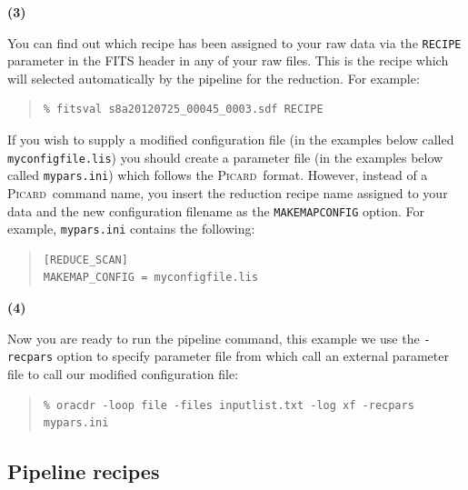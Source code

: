 \documentclass[twoside,11pt]{article}
\newcommand{\xref}[3]{#1}
\newcommand{\xlabel}[1]{}
\renewcommand{\_}{\texttt{\symbol{95}}}
\newenvironment{myquote}{\begin{quote}\begin{small}}{\end{small}\end{quote}}
\newcommand{\picard}{\xref{\textsc{Picard}}{sun265}{}}
\begin{document}
\begin{minipage}[t]{0.05\linewidth}
\textbf{(3)}
\end{minipage}
\begin{minipage}[t]{0.95\linewidth}
You can find out which recipe has been assigned to your raw data via
the \texttt{RECIPE} parameter in the FITS header in any of your raw
files. This is the recipe which will selected automatically by the
pipeline for the reduction. For example:
\begin{myquote}
\begin{verbatim}
% fitsval s8a20120725_00045_0003.sdf RECIPE
\end{verbatim}
\end{myquote}

If you wish to supply a modified configuration file (in the examples
below called \texttt{myconfigfile.lis}) you should create a parameter
file (in the examples below called \texttt{mypars.ini}) which follows
the \picard\ format. However, instead of a \picard\ command name, you
insert the reduction recipe name assigned to your data and the new
configuration filename as the \texttt{MAKEMAP\_CONFIG} option. For
example, \texttt{mypars.ini} contains the following:

\begin{myquote}
\begin{verbatim}
[REDUCE_SCAN]
MAKEMAP_CONFIG = myconfigfile.lis

\end{verbatim}
\end{myquote}

\end{minipage}

\begin{minipage}[t]{0.05\linewidth}
\textbf{(4)}
\end{minipage}
\begin{minipage}[t]{0.95\linewidth}
Now you are ready to run the pipeline command, this example we use the
\texttt{-recpars} option to specify parameter file from which call an
external parameter file to call our modified configuration file:
\begin{myquote}
\begin{verbatim}
% oracdr -loop file -files inputlist.txt -log xf -recpars mypars.ini
\end{verbatim}
\end{myquote}
\end{minipage}

\subsection{\xlabel{pl_output}Pipeline recipes}
\label{sec:recipes}
\end{document}
